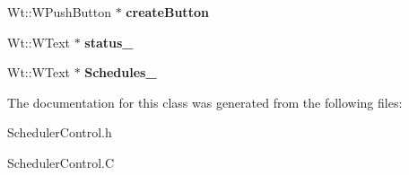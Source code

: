 \begin{DoxyCompactItemize}
\item 
Wt\+::\+W\+Push\+Button $\ast$ {\bfseries create\+Button}\hypertarget{classSchedulerControlWidget_ae2609c02e0649a2fc866746427e00967}{}\label{classSchedulerControlWidget_ae2609c02e0649a2fc866746427e00967}

\item 
Wt\+::\+W\+Text $\ast$ {\bfseries status\+\_\+}\hypertarget{classSchedulerControlWidget_acdfb4ed24b3c2ea60fe91a48390e6235}{}\label{classSchedulerControlWidget_acdfb4ed24b3c2ea60fe91a48390e6235}

\item 
Wt\+::\+W\+Text $\ast$ {\bfseries Schedules\+\_\+}\hypertarget{classSchedulerControlWidget_ad90a2e60df5fed38f2c824c443866f6c}{}\label{classSchedulerControlWidget_ad90a2e60df5fed38f2c824c443866f6c}

\end{DoxyCompactItemize}


The documentation for this class was generated from the following files\+:\begin{DoxyCompactItemize}
\item 
Scheduler\+Control.\+h\item 
Scheduler\+Control.\+C\end{DoxyCompactItemize}
